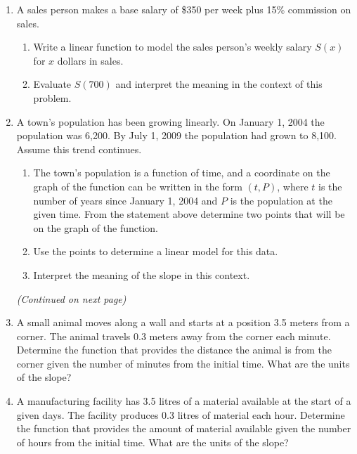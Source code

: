 



\begin{enumerate}
\item A sales person makes a base salary of \$350 per week plus 15\% commission on sales.
\begin{enumerate}
\item Write a linear function to model the sales person's weekly salary $S(x)$ for $x$ dollars in sales.\vfill
\item Evaluate $S(700)$ and interpret the meaning in the context of this problem.
\end{enumerate}

\vfill
\item A town's population has been growing linearly. On January 1,
  2004 the population was 6,200. By July 1, 2009 the population had
  grown to 8,100. Assume this trend continues.

\begin{enumerate}
\item The town's population is a function of time, and a coordinate on
  the graph of the function can be written in the form $(t,P)$, where
  $t$ is the number of years since January 1, 2004 and $P$ is the
  population at the given time. From the statement above determine two
  points that will be on the graph of the function.
  
  \vspace{2em}

\item Use the points to determine a linear model for this data.
  
  \vfill

\item Interpret the meaning of the slope in this context.
  
\end{enumerate}

\vfill

\textit{(Continued on next page)}

\clearpage

\item A small animal moves along a wall and starts at a position 3.5
  meters from a corner.  The animal travels 0.3 meters away from the
  corner each minute. Determine the function that provides the
  distance the animal is from the corner given the number of minutes
  from the initial time. What are the units of the slope?

  \vfill

\item A manufacturing facility has 3.5 litres of a material available
  at the start of a given days. The facility produces 0.3 litres of
  material each hour. Determine the function that provides the amount
  of material available given the number of hours from the initial
  time. What are the units of the slope?

  \vfill




\end{enumerate}



